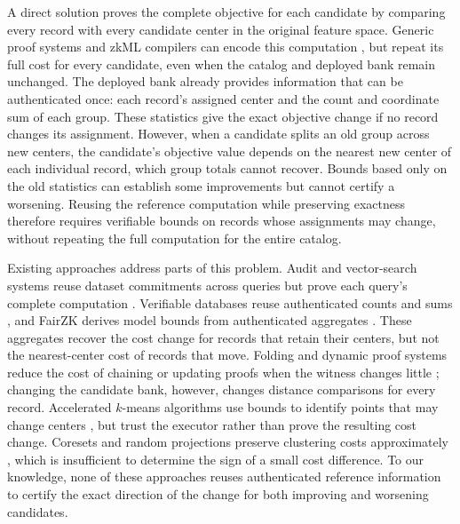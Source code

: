 \documentclass[5p,times,twocolumn]{elsarticle}
\begin{document}
A direct solution proves the complete objective for each candidate by
comparing every record with every candidate center in the original
feature space. Generic proof systems and zkML compilers can encode this
computation \cite{zkcnn2021,chen2024zkml,sun2024zkllm}, but repeat its
full cost for every candidate, even when the catalog and deployed bank
remain unchanged. The deployed bank already provides information that
can be authenticated once: each record's assigned center and the
count and coordinate sum of each group. These statistics give the
exact objective change if no record changes its assignment. However, when a candidate splits an old group across new centers,
the candidate's objective value depends on the nearest new center
of each individual record, which group totals cannot recover. Bounds based only on the old statistics
can establish some improvements but cannot certify a worsening.
Reusing the reference computation while preserving exactness therefore
requires verifiable bounds on records whose assignments may change,
without repeating the full computation for the entire catalog.

Existing approaches address parts of this problem. Audit and
vector-search systems reuse dataset commitments across queries but
prove each query's complete computation
\cite{waiwitlikhit2024zkaudit,v3db2026,zhang2026verif}. Verifiable
databases reuse authenticated counts and sums
\cite{li2010authenticated,zhang2015integridb,backes2013verifiable},
and FairZK derives model bounds from authenticated aggregates
\cite{zhang2025fairzk}. These aggregates recover the cost change for
records that retain their centers, but not the nearest-center cost of
records that move. Folding and dynamic proof systems reduce the cost
of chaining or updating proofs when the witness changes little
\cite{kothapalli2024hypernova,zhang2026dynark}; changing the candidate
bank, however, changes distance comparisons for every record.
Accelerated $k$-means algorithms use bounds to identify points that
may change centers \cite{elkan2003using,hamerly2010making}, but trust
the executor rather than prove the resulting cost change. Coresets and
random projections preserve clustering costs approximately
\cite{feldman2020tiny,makarychev2019performance}, which is insufficient
to determine the sign of a small cost difference. To our knowledge,
none of these approaches reuses authenticated reference information
to certify the exact direction of the change for both improving and
worsening candidates.
\end{document}
